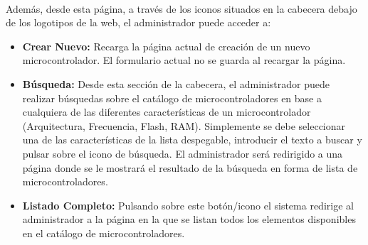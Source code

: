 \paragraph{}Además, desde esta página, a través de los iconos situados en la cabecera debajo de los logotipos de la web, el administrador puede acceder a:

\begin{itemize}
	
	\item \textbf{Crear Nuevo:} Recarga la página actual de creación de un nuevo microcontrolador. El formulario actual no se guarda al recargar la página.

	\item \textbf{Búsqueda:} Desde esta sección de la cabecera, el administrador puede realizar búsquedas sobre el catálogo de microcontroladores en base a cualquiera de las diferentes características de un microcontrolador (Arquitectura, Frecuencia, Flash, RAM). Simplemente se debe seleccionar una de las características de la lista despegable, introducir el texto a buscar y pulsar sobre el icono de búsqueda.
	El administrador será redirigido a una página donde se le mostrará el resultado de la búsqueda en forma de lista de microcontroladores.
			
	\item \textbf{Listado Completo:} Pulsando sobre este botón/icono el sistema redirige al administrador a la página en la que se listan todos los elementos disponibles en el catálogo de microcontroladores.
\end{itemize}